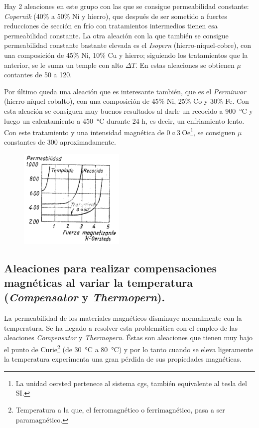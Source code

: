 \documentclass[12pt,a4paper]{article}
\begin{document}
Hay 2 aleaciones en este grupo con las que se consigue permeabilidad constante: \textit{Copernik} (40\% a 50\% Ni y hierro), que después de ser sometido a fuertes reducciones de sección en frío con tratamientos intermedios tienen esa permeabilidad constante. La otra aleación con la que también se consigue permeabilidad constante bastante elevada es el \textit{Isopern} (hierro-níquel-cobre), con una composición de 45\% Ni, 10\% Cu y hierro; siguiendo los tratamientos que la anterior, se le suma un temple con alto $\Delta T$. En estas aleaciones se obtienen $\mu$ contantes de 50 a 120.

Por último queda una aleación que es interesante también, que es el \textit{Perminvar} (hierro-níquel-cobalto), con una composición de 45\% Ni, 25\% Co y 30\% Fe. Con esta aleación se consiguen muy buenos resultados al darle un recocido a \SI{900}{\celsius} y luego un calentamiento a \SI{450}{\celsius} durante 24 h, es decir, un enfriamiento lento. Con este tratamiento y una intensidad magnética de $0\ a\ 3\ \mathrm{Oe}$\footnote{La unidad oersted pertenece al sistema cgs, también equivalente al tesla del SI.}, se consiguen $\mu$ constantes de 300 aproximadamente.

\begin{figure}[t]    
    \centering         
    \includegraphics[width=0.45\textwidth]{IMAGENES LATEX/9.png}
    \caption{}
    \label{fig:oersted}
\end{figure}

\subsection{Aleaciones para realizar compensaciones magnéticas al variar la temperatura (\textit{Compensator} y \textit{Thermopern}).}

La permeabilidad de los materiales magnéticos disminuye normalmente con la temperatura. Se ha llegado a resolver esta problemática con el empleo de las aleaciones \textit{Compensator} y \textit{Thermopern}. Éstas son aleaciones que tienen muy bajo el punto de Curie\footnote{Temperatura a la que, el ferromagnético o ferrimagnético, pasa a ser paramagnético.} (de \SI{30}{\celsius} a \SI{80}{\celsius}) y por lo tanto cuando se eleva ligeramente la temperatura experimenta una gran pérdida de sus propiedades magnéticas.
\end{document}
